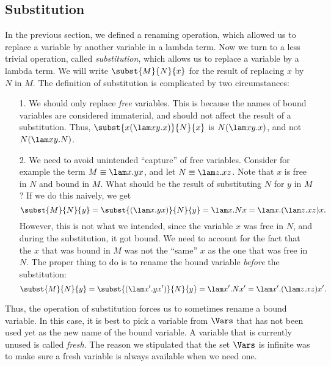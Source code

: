 \documentclass[12pt]{article}
\begin{document}
\subsection{Substitution}\label{ssec-substitution}

In the previous section, we defined a renaming operation, which
allowed us to replace a variable by another variable in a lambda term.
Now we turn to a less trivial operation, called {\em substitution},
which allows us to replace a variable by a lambda term. We will write
$\subst{M}{N}{x}$ for the result of replacing $x$ by $N$ in $M$. The
definition of substitution is complicated by two circumstances:
\begin{enumerate}
\item[1.] We should only replace {\em free} variables. This is because
  the names of bound variables are considered immaterial, and should
  not affect the result of a substitution. Thus, $\subst{x(\lam
    xy.x)}{N}{x}$ is $N(\lam xy.x)$, and not $N(\lam xy.N)$.
\item[2.] We need to avoid unintended ``capture'' of free
  variables. Consider for example the term $M\equiv\lam x.yx$, and let
  $N\equiv\lam z.xz$. Note that $x$ is free in $N$ and bound in $M$.
  What should be the result of substituting $N$ for $y$ in $M$?
  If we do this naively, we get 
  \[ \subst{M}{N}{y}=\subst{(\lam x.yx)}{N}{y}=
     \lam x.Nx=\lam x.(\lam z.xz)x. 
  \]
  However, this is not what we intended, since the variable $x$ was
  free in $N$, and during the substitution, it got bound. We need to
  account for the fact that the $x$ that was bound in $M$ was not the
  ``same'' $x$ as the one that was free in $N$. The proper thing to do
  is to rename the bound variable {\em before} the substitution:
  \[ \subst{M}{N}{y}=\subst{(\lam x'.yx')}{N}{y}=
     \lam x'.Nx'=\lam x'.(\lam z.xz)x'. 
  \]
\end{enumerate}

Thus, the operation of substitution forces us to sometimes rename a
bound variable. In this case, it is best to pick a variable from
$\Vars$ that has not been used yet as the new name of the bound
variable. A variable that is currently unused is called {\em fresh}.
The reason we stipulated that the set $\Vars$ is infinite was to make
sure a fresh variable is always available when we need one.
\end{document}
